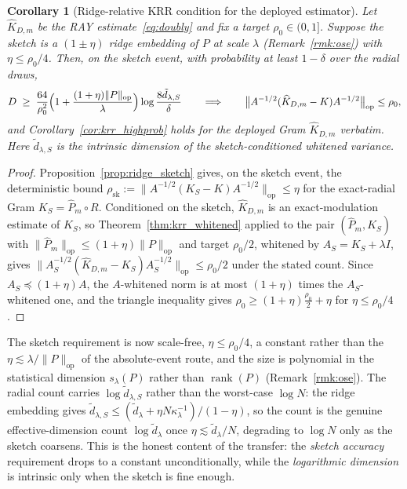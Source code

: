 \documentclass{article}
\newtheorem{corollary}[theorem]{Corollary}
\begin{document}
\begin{corollary}[Ridge-relative KRR condition for the deployed estimator]\label{cor:krr_deployed}
Let $\widehat K_{D,m}$ be the RAY estimate~\eqref{eq:doubly} and fix a target $\rho_0\in(0,1]$. Suppose the sketch is a $(1\pm\eta)$ ridge embedding of $P$ at scale $\lambda$ (Remark~\ref{rmk:ose}) with $\eta\le\rho_0/4$. Then, on the sketch event, with probability at least $1-\delta$ over the radial draws,
\[
D\;\ge\;\frac{64}{\rho_0^{2}}\Bigl(1+\frac{(1+\eta)\|P\|_{\mathrm{op}}}{\lambda}\Bigr)\log\frac{8\tilde d_{\lambda,S}}{\delta}
\qquad\Longrightarrow\qquad
\bigl\|A^{-1/2}(\widehat K_{D,m}-K)A^{-1/2}\bigr\|_{\mathrm{op}}\le\rho_0,
\]
and Corollary~\ref{cor:krr_highprob} holds for the deployed Gram $\widehat K_{D,m}$ verbatim. Here $\tilde d_{\lambda,S}$ is the intrinsic dimension of the sketch-conditioned whitened variance.
\end{corollary}
\begin{proof}
Proposition~\ref{prop:ridge_sketch} gives, on the sketch event, the deterministic bound $\rho_{\mathrm{sk}}:=\|A^{-1/2}(K_S-K)A^{-1/2}\|_{\mathrm{op}}\le\eta$ for the exact-radial Gram $K_S=\widehat P_m\circ R$. Conditioned on the sketch, $\widehat K_{D,m}$ is an exact-modulation estimate of $K_S$, so Theorem~\ref{thm:krr_whitened} applied to the pair $(\widehat P_m,K_S)$ with $\|\widehat P_m\|_{\mathrm{op}}\le(1+\eta)\|P\|_{\mathrm{op}}$ and target $\rho_0/2$, whitened by $A_S=K_S+\lambda I$, gives $\|A_S^{-1/2}(\widehat K_{D,m}-K_S)A_S^{-1/2}\|_{\mathrm{op}}\le\rho_0/2$ under the stated count. Since $A_S\preceq(1+\eta)A$, the $A$-whitened norm is at most $(1+\eta)$ times the $A_S$-whitened one, and the triangle inequality gives $\rho_0\ge(1+\eta)\tfrac{\rho_0}{2}+\eta$ for $\eta\le\rho_0/4$.
\end{proof}
\noindent The sketch requirement is now scale-free, $\eta\le\rho_0/4$, a constant rather than the $\eta\lesssim\lambda/\|P\|_{\mathrm{op}}$ of the absolute-event route, and the size is polynomial in the statistical dimension $s_\lambda(P)$ rather than $\operatorname{rank}(P)$ (Remark~\ref{rmk:ose}). The radial count carries $\log\tilde d_{\lambda,S}$ rather than the worst-case $\log N$: the ridge embedding gives $\tilde d_{\lambda,S}\le(\tilde d_\lambda+\eta N\kappa_\lambda^{-1})/(1-\eta)$, so the count is the genuine effective-dimension count $\log\tilde d_\lambda$ once $\eta\lesssim\tilde d_\lambda/N$, degrading to $\log N$ only as the sketch coarsens. This is the honest content of the transfer: the \emph{sketch accuracy} requirement drops to a constant unconditionally, while the \emph{logarithmic dimension} is intrinsic only when the sketch is fine enough.
\end{document}
